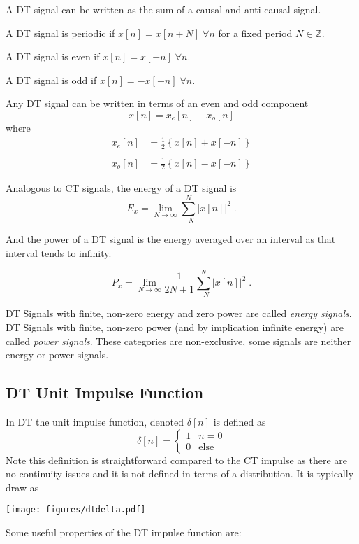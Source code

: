 A DT signal can be written as the sum of a causal and anti-causal signal.

A DT signal is periodic if $x[n] = x[n + N] \; \forall n$ for a fixed period $N \in \mathbb{Z}$.

A DT signal is even if $x[n] = x[-n] \; \forall n$. 

A DT signal is odd if $x[n] = -x[-n] \; \forall n$.

Any DT signal can be written in terms of an even and odd component
\[
x[n] = x_e[n] + x_o[n] 
\]
where 
\[
\begin{array}{ll}
x_e[n] &= \frac{1}{2}\left\{x[n] + x[-n]\right\} \\
& \\
x_o[n] &= \frac{1}{2}\left\{x[n] - x[-n]\right\}
\end{array}
\]

Analogous to CT signals, the energy of a DT signal is
\[
E_x = \lim_{N\rightarrow\infty} \sum\limits_{-N}^N \lvert x[n]\rvert^2 \; .
\]

And the power of a DT signal is the energy averaged over an interval as that interval tends to infinity.

\[
P_x = \lim_{N\rightarrow\infty} \frac{1}{2N+1} \sum\limits_{-N}^N \lvert x[n]\rvert^2 \; .
\]

DT Signals with finite, non-zero energy and zero power are called {\it energy signals}. DT Signals with finite, non-zero power (and by implication infinite energy) are called {\it power signals}. These categories are non-exclusive, some signals are neither energy or power signals.

\subsection{DT Unit Impulse Function}

In DT the unit impulse function, denoted $\delta[n]$ is defined as
\[
\delta[n] = \left\{
\begin{array}{ll}
  1 & n = 0\\
  0 & \text{else}
\end{array}
\right.
\]
Note this definition is straightforward compared to the CT impulse as there are no continuity issues and it is not defined in terms of a distribution. It is typically draw as
\begin{center}
  \texttt{[image: figures/dtdelta.pdf]}
\end{center}

Some useful properties of the DT impulse function are:

